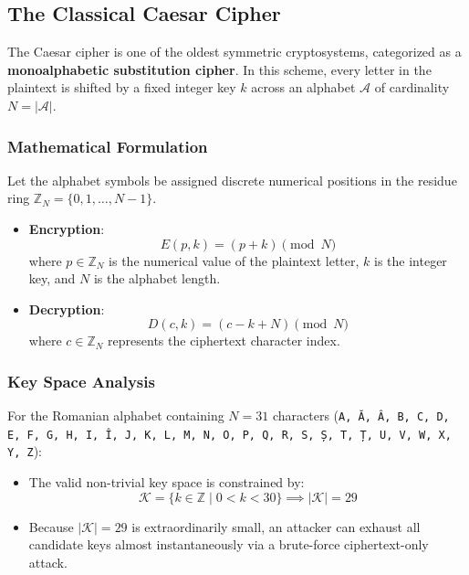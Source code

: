 \documentclass[12pt,a4paper]{article}
\begin{document}
\subsection{The Classical Caesar Cipher}
The Caesar cipher is one of the oldest symmetric cryptosystems, categorized as a \textbf{monoalphabetic substitution cipher}. In this scheme, every letter in the plaintext is shifted by a fixed integer key $k$ across an alphabet $\mathcal{A}$ of cardinality $N = |\mathcal{A}|$.

\subsubsection{Mathematical Formulation}
Let the alphabet symbols be assigned discrete numerical positions in the residue ring $\mathbb{Z}_N = \{0, 1, \dots, N-1\}$.
\begin{itemize}
    \item \textbf{Encryption}:
    \begin{equation}
        E(p, k) = (p + k) \pmod N
    \end{equation}
    where $p \in \mathbb{Z}_N$ is the numerical value of the plaintext letter, $k$ is the integer key, and $N$ is the alphabet length.
    
    \item \textbf{Decryption}:
    \begin{equation}
        D(c, k) = (c - k + N) \pmod N
    \end{equation}
    where $c \in \mathbb{Z}_N$ represents the ciphertext character index.
\end{itemize}

\subsubsection{Key Space Analysis}
For the Romanian alphabet containing $N = 31$ characters (\texttt{A, Ă, Â, B, C, D, E, F, G, H, I, Î, J, K, L, M, N, O, P, Q, R, S, Ș, T, Ț, U, V, W, X, Y, Z}):
\begin{itemize}
    \item The valid non-trivial key space is constrained by:
    \begin{equation}
        \mathcal{K} = \{ k \in \mathbb{Z} \mid 0 < k < 30 \} \implies |\mathcal{K}| = 29
    \end{equation}
    \item Because $|\mathcal{K}| = 29$ is extraordinarily small, an attacker can exhaust all candidate keys almost instantaneously via a brute-force ciphertext-only attack.
\end{itemize}
\end{document}

